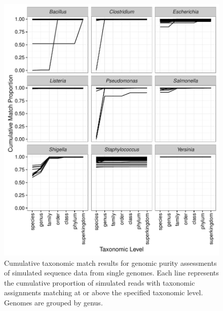 \documentclass[fleqn,10pt,lineno]{wlpeerj}\usepackage[]{graphicx}\usepackage[]{color}
\makeatletter
\def\maxwidth{ %
  \ifdim\Gin@nat@width>\linewidth
    \linewidth
  \else
    \Gin@nat@width
  \fi
}
\newenvironment{knitrout}{}{} %
\makeatother
\begin{document}
\begin{knitrout}
\color{fgcolor}\begin{figure}

{\centering \includegraphics[width=\maxwidth]{figure/single_org_cum-1} 

}

\caption[Cumulative taxonomic match results for genomic purity assessments of simulated sequence data from single genomes]{Cumulative taxonomic match results for genomic purity assessments of simulated sequence data from single genomes.  Each line represents the cumulative proportion of simulated reads with taxonomic assignments matching at or above the specified taxonomic level. Genomes are grouped by genus.}\label{fig:single_org_cum}
\end{figure}


\end{knitrout}
\end{document}
